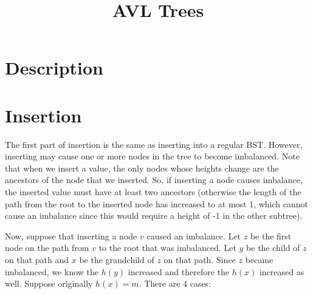\documentclass[12pt]{article}
\begin{document}
\title{AVL Trees}
\author{}
\maketitle


\section*{Description}


\section*{Insertion}
The first part of insertion is the same as inserting into a regular BST. However, inserting may cause one or more nodes in the tree to become imbalanced. Note that when we insert a value, the only nodes whose heights change are the ancestors of the node that we inserted. So, if inserting a node causes imbalance, the inserted value must have at least two ancestors (otherwise the length of the path from the root to the inserted node has increased to at most 1, which cannot cause an imbalance since this would require a height of -1 in the other subtree).

Now, suppose that inserting a node $v$ caused an imbalance. Let $z$ be the first node on the path from $v$ to the root that was imbalanced. Let $y$ be the child of $z$ on that path and $x$ be the grandchild of $z$ on that path. Since $z$ became imbalanced, we know the $h(y)$ increased and therefore the $h(x)$ increased as well. Suppose originally $h(x) = m$. There are 4 cases:

\end{document}
